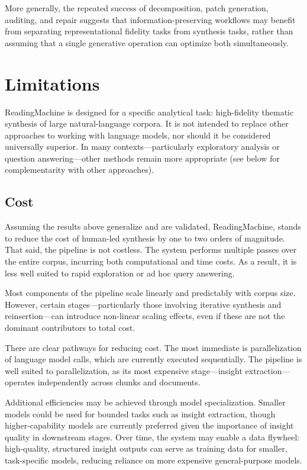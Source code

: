 \documentclass[
  11pt,
]{article}
\begin{document}
More generally, the repeated success of decomposition, patch generation, auditing, 
and repair suggests that information-preserving workflows may benefit from separating 
representational fidelity tasks from synthesis tasks, rather than assuming that a 
single generative operation can optimize both simultaneously. 

\section{Limitations}\label{limitations}

ReadingMachine is designed for a specific analytical task: high-fidelity
thematic synthesis of large natural-language corpora. It is not intended
to replace other approaches to working with language models, nor should
it be considered universally superior. In many contexts---particularly
exploratory analysis or question answering---other methods remain more
appropriate (see below for complementarity with other approaches).

\subsection{Cost}\label{cost}

Assuming the results above generalize and are validated, ReadingMachine,
stands to reduce the cost of human-led synthesis by one to two orders of
magnitude. That said, the pipeline is not costless. The system performs
multiple passes over the entire corpus, incurring both computational and
time costs. As a result, it is less well suited to rapid exploration or
ad hoc query answering.

Most components of the pipeline scale linearly and predictably with
corpus size. However, certain stages---particularly those involving
iterative synthesis and reinsertion---can introduce non-linear scaling
effects, even if these are not the dominant contributors to total cost.

There are clear pathways for reducing cost. The most immediate is
parallelization of language model calls, which are currently executed
sequentially. The pipeline is well suited to parallelization, as its
most expensive stage---insight extraction---operates independently
across chunks and documents.

Additional efficiencies may be achieved through model specialization.
Smaller models could be used for bounded tasks such as insight
extraction, though higher-capability models are currently preferred
given the importance of insight quality in downstream stages. Over time,
the system may enable a data flywheel: high-quality, structured insight
outputs can serve as training data for smaller, task-specific models,
reducing reliance on more expensive general-purpose models.
\end{document}
